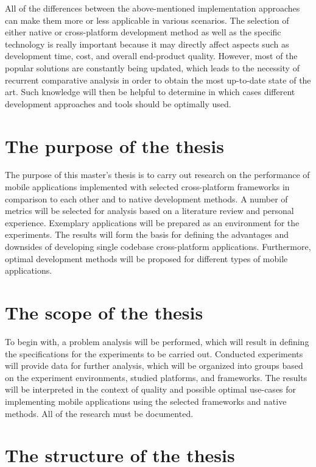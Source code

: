 All of the differences between the above-mentioned implementation approaches can make them more or less applicable in various scenarios. The selection of either native or cross-platform development method as well as the specific technology is really important because it may directly affect aspects such as development time, cost, and overall end-product quality. However, most of the popular solutions are constantly being updated, which leads to the necessity of recurrent comparative analysis in order to obtain the most up-to-date state of the art. Such knowledge will then be helpful to determine in which cases different development approaches and tools should be optimally used.

\section{The purpose of the thesis}

The purpose of this master's thesis is to carry out research on the performance of mobile applications implemented with selected cross-platform frameworks in comparison to each other and to native development methods. A number of metrics will be selected for analysis based on a literature review and personal experience. Exemplary applications will be prepared as an environment for the experiments. The results will form the basis for defining the advantages and downsides of developing single codebase cross-platform applications. Furthermore, optimal development methods will be proposed for different types of mobile applications.

\section{The scope of the thesis}

To begin with, a problem analysis will be performed, which will result in defining the specifications for the experiments to be carried out. Conducted experiments will provide data for further analysis, which will be organized into groups based on the experiment environments, studied platforms, and frameworks. The results will be interpreted in the context of quality and possible optimal use-cases for implementing mobile applications using the selected frameworks and native methods. All of the research must be documented.

\section{The structure of the thesis}

